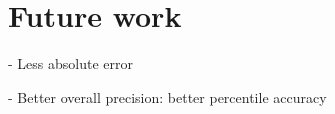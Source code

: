 \documentclass[12pt]{report} %
\begin{document}
\section{Future work}
- Less absolute error

- Better overall precision: better percentile accuracy




\clearpage
{}

\printbibliography




\end{document}

